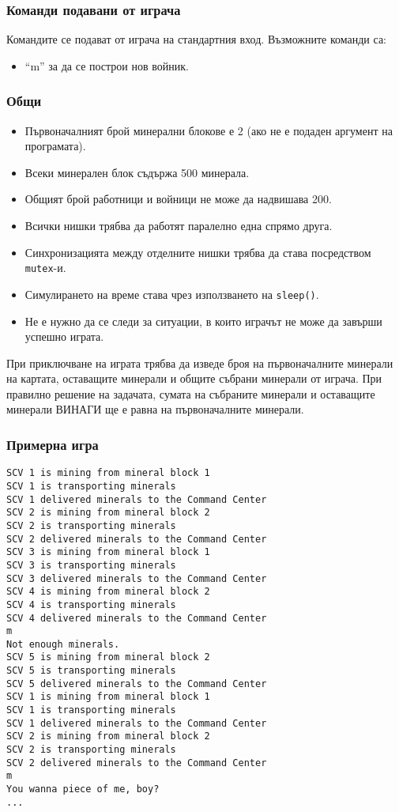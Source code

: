 \documentclass[a4paper,10pt]{article}
\begin{document}
			\subsubsection{Команди подавани от играча}
			Командите се подават от играча на стандартния вход. Възможните команди са:
			\begin{itemize}
				\item ``m'' за да се построи нов войник.
			\end{itemize}
			
			\subsubsection{Общи}
			\begin{itemize}
				\item Първоначалният брой минерални блокове е 2 (ако не е подаден аргумент на програмата).
				\item Всеки минерален блок съдържа 500 минерала.
				\item Общият брой работници и войници не може да надвишава 200.
				\item Всички нишки трябва да работят паралелно една спрямо друга.
				\item Синхронизацията между отделните нишки трябва да става посредством \verb|mutex|-и.
				\item Симулирането на време става чрез използването на \verb|sleep()|.
				\item Не е нужно да се следи за ситуации, в които играчът не може да завърши успешно играта.
			\end{itemize}
			
			При приключване на играта трябва да изведе броя на първоначалните минерали на картата, оставащите минерали и общите събрани минерали от играча. При правилно решение на задачата, сумата на събраните минерали и оставащите минерали ВИНАГИ ще е равна на първоначалните минерали.
			
			\subsubsection{Примерна игра}
				\begin{verbatim}
SCV 1 is mining from mineral block 1
SCV 1 is transporting minerals
SCV 1 delivered minerals to the Command Center
SCV 2 is mining from mineral block 2
SCV 2 is transporting minerals
SCV 2 delivered minerals to the Command Center
SCV 3 is mining from mineral block 1
SCV 3 is transporting minerals
SCV 3 delivered minerals to the Command Center
SCV 4 is mining from mineral block 2
SCV 4 is transporting minerals
SCV 4 delivered minerals to the Command Center
m
Not enough minerals.
SCV 5 is mining from mineral block 2
SCV 5 is transporting minerals
SCV 5 delivered minerals to the Command Center
SCV 1 is mining from mineral block 1
SCV 1 is transporting minerals
SCV 1 delivered minerals to the Command Center
SCV 2 is mining from mineral block 2
SCV 2 is transporting minerals
SCV 2 delivered minerals to the Command Center
m
You wanna piece of me, boy?
...
\end{verbatim}
	
\end{document}
